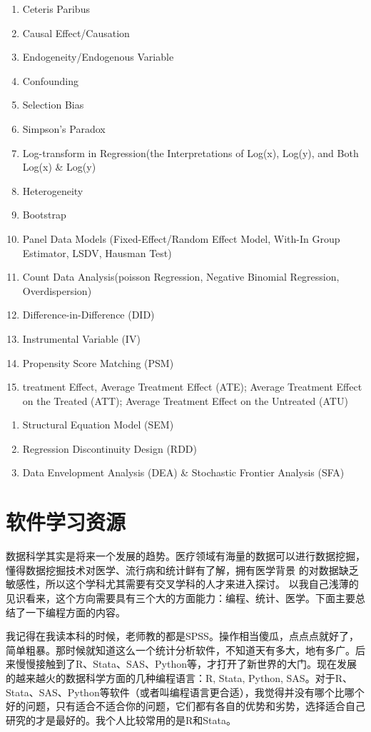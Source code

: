 \documentclass[11pt, a4paper]{article}
\begin{document}
\begin{enumerate}[(1)]
	\item Ceteris Paribus
	\item Causal Effect/Causation 
	\item Endogeneity/Endogenous Variable 
	\item Confounding
	\item Selection Bias
	\item Simpson's Paradox 
	\item Log-transform in Regression(the Interpretations of Log(x), Log(y), and Both Log(x) \& Log(y)
	\item Heterogeneity 
	\item Bootstrap 
	\item Panel Data Models (Fixed-Effect/Random Effect Model, With-In Group Estimator, LSDV, Hausman Test) 
	\item Count Data Analysis(poisson Regression, Negative Binomial Regression, Overdispersion)
	\item Difference-in-Difference (DID) 
	\item Instrumental Variable (IV) 
	\item Propensity Score Matching (PSM)
	\item treatment Effect, Average Treatment Effect (ATE); Average Treatment Effect on the Treated (ATT); Average Treatment Effect on the Untreated (ATU)
\end{enumerate}


\begin{enumerate}[(1)]
	\item Structural Equation Model (SEM)
	\item Regression Discontinuity Design (RDD)
	\item Data Envelopment Analysis (DEA) \& Stochastic Frontier Analysis (SFA)
\end{enumerate}


\section{软件学习资源}
数据科学其实是将来一个发展的趋势。医疗领域有海量的数据可以进行数据挖掘，懂得数据挖掘技术对医学、流行病和统计鲜有了解，拥有医学背景 的对数据缺乏敏感性，所以这个学科尤其需要有交叉学科的人才来进入探讨。 以我自己浅薄的见识看来，这个方向需要具有三个大的方面能力：编程、统计、医学。下面主要总结了一下编程方面的内容。

我记得在我读本科的时候，老师教的都是SPSS。操作相当傻瓜，点点点就好了，简单粗暴。那时候就知道这么一个统计分析软件，不知道天有多大，地有多广。后来慢慢接触到了R、Stata、SAS、Python等，才打开了新世界的大门。现在发展的越来越火的数据科学方面的几种编程语言：R, Stata, Python, SAS。对于R、Stata、SAS、Python等软件（或者叫编程语言更合适），我觉得并没有哪个比哪个好的问题，只有适合不适合你的问题，它们都有各自的优势和劣势，选择适合自己研究的才是最好的。我个人比较常用的是R和Stata。
\end{document}
